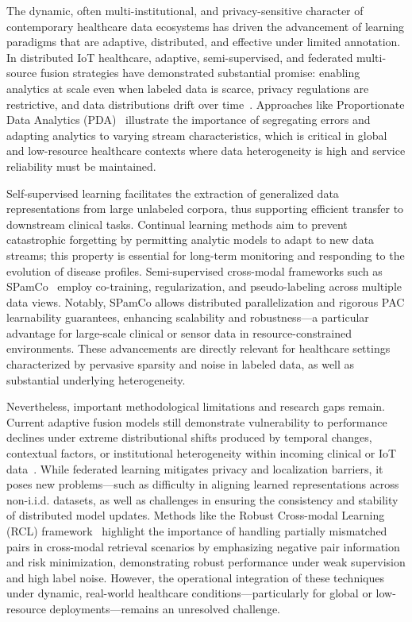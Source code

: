 \documentclass[sigconf]{acmart}
\begin{document}
The dynamic, often multi-institutional, and privacy-sensitive character of contemporary healthcare data ecosystems has driven the advancement of learning paradigms that are adaptive, distributed, and effective under limited annotation. In distributed IoT healthcare, adaptive, semi-supervised, and federated multi-source fusion strategies have demonstrated substantial promise: enabling analytics at scale even when labeled data is scarce, privacy regulations are restrictive, and data distributions drift over time~\cite{ref105,ref106,ref107}. Approaches like Proportionate Data Analytics (PDA)~\cite{ref106} illustrate the importance of segregating errors and adapting analytics to varying stream characteristics, which is critical in global and low-resource healthcare contexts where data heterogeneity is high and service reliability must be maintained.

Self-supervised learning facilitates the extraction of generalized data representations from large unlabeled corpora, thus supporting efficient transfer to downstream clinical tasks. Continual learning methods aim to prevent catastrophic forgetting by permitting analytic models to adapt to new data streams; this property is essential for long-term monitoring and responding to the evolution of disease profiles. Semi-supervised cross-modal frameworks such as SPamCo~\cite{ref105} employ co-training, regularization, and pseudo-labeling across multiple data views. Notably, SPamCo allows distributed parallelization and rigorous PAC learnability guarantees, enhancing scalability and robustness—a particular advantage for large-scale clinical or sensor data in resource-constrained environments. These advancements are directly relevant for healthcare settings characterized by pervasive sparsity and noise in labeled data, as well as substantial underlying heterogeneity.

Nevertheless, important methodological limitations and research gaps remain. Current adaptive fusion models still demonstrate vulnerability to performance declines under extreme distributional shifts produced by temporal changes, contextual factors, or institutional heterogeneity within incoming clinical or IoT data~\cite{ref106}. While federated learning mitigates privacy and localization barriers, it poses new problems—such as difficulty in aligning learned representations across non-i.i.d. datasets, as well as challenges in ensuring the consistency and stability of distributed model updates. Methods like the Robust Cross-modal Learning (RCL) framework~\cite{ref104} highlight the importance of handling partially mismatched pairs in cross-modal retrieval scenarios by emphasizing negative pair information and risk minimization, demonstrating robust performance under weak supervision and high label noise. However, the operational integration of these techniques under dynamic, real-world healthcare conditions—particularly for global or low-resource deployments—remains an unresolved challenge.
\end{document}
